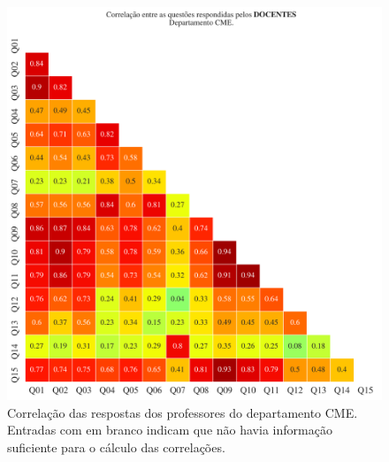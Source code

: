 \documentclass[a4paper,10pt]{article}
\begin{document}
\begin{figure}[h]
\centering
\includegraphics[width=0.999\linewidth]{matriz_corr__CME_docentes.png}
\caption{\label{fig:corr_docentes}Correlação das respostas dos professores do departamento CME. Entradas com em branco indicam que não havia informação suficiente para o cálculo das correlações.}
\end{figure}
\end{document}
